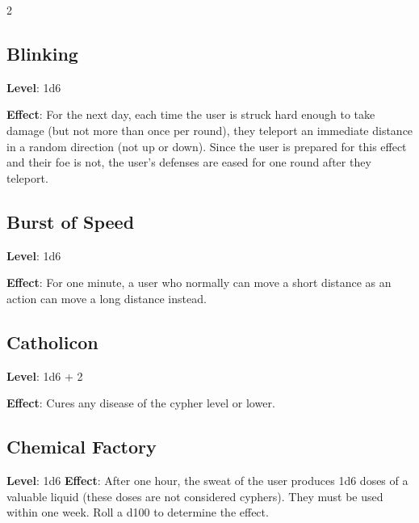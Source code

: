 \begin{multicols}{2}
\subsection{Blinking}

\textbf{Level}: 1d6

\textbf{Effect}: For the next day, each time the user is struck hard enough to take damage (but not more than once per round), they teleport an immediate distance in a random direction (not up or down). Since the user is prepared for this effect and their foe is not, the user’s defenses are eased for one round after they teleport. 

\subsection{Burst of Speed}

\textbf{Level}: 1d6

\textbf{Effect}: For one minute, a user who normally can move a short distance as an action can move a long distance instead.

\subsection{Catholicon}

\textbf{Level}: 1d6 + 2

\textbf{Effect}: Cures any disease of the cypher level or lower.

\subsection{Chemical Factory}

\textbf{Level}: 1d6
\textbf{Effect}: After one hour, the sweat of the user produces 1d6 doses of a valuable liquid (these doses are not considered cyphers). They must be used within one week. Roll a d100 to determine the effect.

\end{multicols}

